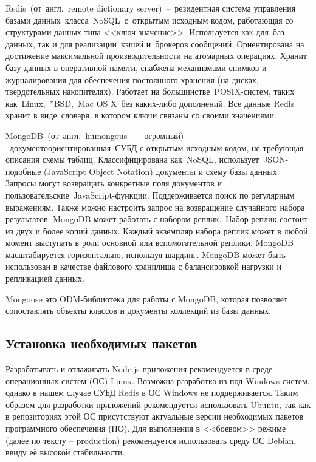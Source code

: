 Redis (от англ. remote dictionary server) -- резидентная система управления базами данных класса NoSQL с открытым исходным кодом, работающая со структурами данных типа <<ключ-значение>>. Используется как для баз данных, так и для реализации кэшей и брокеров сообщений. Ориентирована на достижение максимальной производительности на атомарных операциях. Хранит базу данных в оперативной памяти, снабжена механизмами снимков и журналирования для обеспечения постоянного хранения (на дисках, твердотельных накопителях). Работает на большинстве POSIX-систем, таких как Linux, *BSD, Mac OS X без каких-либо дополнений. Все данные Redis хранит в виде словаря, в котором ключи связаны со своими значениями.

MongoDB (от англ. humongous — огромный) -- документоориентированная СУБД с открытым исходным кодом, не требующая описания схемы таблиц. Классифицирована как NoSQL, использует JSON-подобные (JavaScript Object Notation) документы и схему базы данных. Запросы могут возвращать конкретные поля документов и пользовательские JavaScript-функции. Поддерживается поиск по регулярным выражениям. Также можно настроить запрос на возвращение случайного набора результатов. MongoDB может работать с набором реплик. Набор реплик состоит из двух и более копий данных. Каждый экземпляр набора реплик может в любой момент выступать в роли основной или вспомогательной реплики. MongoDB масштабируется горизонтально, используя шардинг. MongoDB может быть использован в качестве файлового хранилища с балансировкой нагрузки и репликацией данных.

Mongoose это ODM-библиотека для работы с Mon\-goDB, которая позволяет сопоставлять объекты классов и документы коллекций из базы данных.

\subsection{Установка необходимых пакетов}

Разрабатывать и отлаживать Node.js-приложения рекомендуется в среде операционных систем (ОС) Linux. Возможна разработка из-под Windows-систем, однако в нашем случае СУБД Redis в ОС Windows не поддерживается. Таким образом для разработки приложений рекомендуется использовать Ubuntu, так как в репозиториях этой ОС присутствуют актуальные версии необходимых пакетов программного обеспечения (ПО). Для выполнения в <<боевом>> режиме (далее по тексту -- production) рекомендуется использовать среду ОС Debian, ввиду её высокой стабильности.

